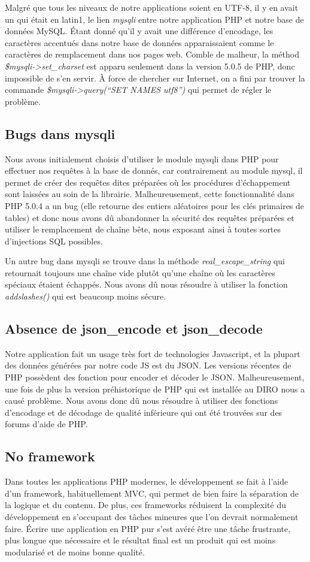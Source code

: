 \documentclass[10pt]{article}
\begin{document}
Malgré que tous les niveaux de notre applications soient en UTF-8, il
y en avait un qui était en latin1, le lien {\em mysqli} entre notre
application PHP et notre base de données MySQL. Étant donné qu'il y
avait une différence d'encodage, les caractères accentués dans notre
base de données apparaissaient comme le caractères de remplacement
dans nos pages web. Comble de malheur, la méthod {\em
  \$mysqli->set\_charset} est apparu seulement dans la version 5.0.5
de PHP, donc impossible de s'en servir. À force de chercher sur
Internet, on a fini par trouver la commande {\em \$mysqli->query(``SET
  NAMES utf8'')} qui permet de régler le problème.

\subsection{Bugs dans mysqli}

Nous avons initialement choisis d'utiliser le module mysqli dans PHP
pour effectuer nos requêtes à la base de donnés, car contrairement au
module mysql, il permet de créer des requêtes dites préparées où les
procédures d'échappement sont laissées au soin de la librairie.
Malheureusement, cette fonctionnalité dans PHP 5.0.4 a un bug (elle
retourne des entiers aléatoires pour les clés primaires de tables) et
donc nous avons dû abandonner la sécurité des requêtes préparées et
utiliser le remplacement de chaîne bête, nous exposant ainsi à toutes
sortes d'injections SQL possibles.

Un autre bug dans mysqli se trouve dans la méthode {\em
  real\_escape\_string} qui retournait toujours une chaîne vide plutôt
qu'une chaîne où les caractères spéciaux étaient échappés.  Nous avons
dû nous résoudre à utiliser la fonction {\em addslashes()} qui est
beaucoup moins sécure.

\subsection{Absence de json\_encode et json\_decode}

Notre application fait un usage très fort de technologies Javascript,
et la plupart des données générées par notre code JS est du JSON. Les
versions récentes de PHP possèdent des fonction pour encoder et
décoder le JSON. Malheureusement, une fois de plus la version
préhistorique de PHP qui est installée au DIRO nous a causé problème.
Nous avons donc dû nous résoudre à utiliser des fonctions d'encodage
et de décodage de qualité inférieure qui ont été trouvées sur des
forums d'aide de PHP.

\subsection{No framework}

Dans toutes les applications PHP modernes, le développement se fait à
l'aide d'un framework, habituellement MVC, qui permet de bien faire la
séparation de la logique et du contenu.  De plus, ces frameworks
réduisent la complexité du développement en s'occupant des tâches
mineures que l'on devrait normalement faire.  Écrire une application
en PHP pur s'est avéré être une tâche frustrante, plus longue que
nécessaire et le résultat final est un produit qui est moins
modularisé et de moins bonne qualité.
\end{document}
